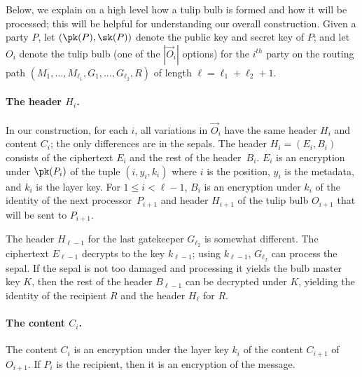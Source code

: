 \documentclass[runningheads,a4paper]{llncs}
\begin{document}
Below, we explain on a high level how a tulip bulb is formed and how it will be processed; this will be helpful for understanding our overall construction. %
Given a party $P$, let $(\pk(P), \sk(P))$ denote the public key and secret key of $P$; and let $O_{i}$ denote the tulip bulb (one of the $|\vec{O}_i|$ options) for the $i^{th}$ party on the routing path $(M_1,\ldots, M_{\ell_1}, G_1,\ldots, G_{\ell_2}, R)$ of length $\ell = \ell_1 + \ell_2 + 1$. %

\paragraph{The header $H_i$.}  
In our construction, for each $i$, all variations in $\vec{O}_i$ have the same header $H_i$ and content $C_i$; the only differences are in the sepals.  The header $H_i = (E_i, B_i)$ consists of the ciphertext $E_i$ and the rest of the header~$B_i$.  $E_i$ is an encryption under $\pk(P_i)$ of the tuple $(i, y_i, k_i)$ where $i$ is the position, $y_i$ is the metadata, and $k_i$ is the layer key.  For $1\leq i < \ell-1$, $B_i$ is an encryption under $k_i$ of the identity of the next processor~$P_{i+1}$ and header $H_{i+1}$ of the tulip bulb $O_{i+1}$ that will be sent to $P_{i+1}$. 

The header $H_{\ell-1}$ for the last gatekeeper $G_{\ell_2}$ is somewhat different.  The ciphertext $E_{\ell-1}$ decrypts to the key $k_{\ell-1}$; using $k_{\ell-1}$, $G_{\ell_2}$ can process the sepal.  If the sepal is not too damaged and processing it yields the bulb master key $K$, then the rest of the header $B_{\ell-1}$ can be decrypted under $K$, yielding the identity of the recipient $R$ and the header $H_{\ell}$ for $R$. 

\paragraph{The content $C_i$.}  The content $C_i$ is an encryption under the layer key $k_i$ of the content $C_{i+1}$ of $O_{i+1}$.  If $P_i$ is the recipient, then it is an encryption of the message.
\end{document}

